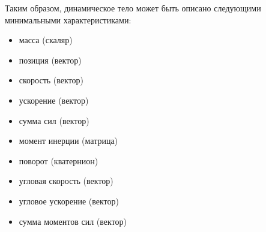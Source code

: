Таким образом, динамическое тело может быть описано
следующими минимальными характеристиками:
\begin{itemize}
  \item масса (скаляр)
  \item позиция (вектор)
  \item скорость (вектор)
  \item ускорение (вектор) %
  \item сумма сил (вектор) %
  \item момент инерции (матрица)
  \item поворот (кватернион)
  \item угловая скорость (вектор)
  \item угловое ускорение (вектор) %
  \item сумма моментов сил (вектор) %
\end{itemize}

%
%
